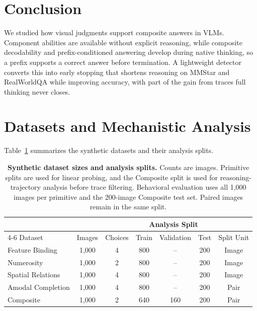 \documentclass{article} %
\begin{document}
\vspace{-4mm}
\section{Conclusion}\label{sec:conclusion}
\vspace{-1mm}

We studied how visual judgments support composite answers in VLMs. Component abilities are available without explicit reasoning, while composite decodability and prefix-conditioned answering develop during native thinking, so a prefix supports a correct answer before termination. A lightweight detector converts this into early stopping that shortens reasoning on MMStar and RealWorldQA while improving accuracy, with part of the gain from traces full thinking never closes.




\appendix
\section{Datasets and Mechanistic Analysis}
\label{app:data_generation}

Table~\ref{tab:dataset_splits} summarizes the synthetic datasets and their analysis splits.

\begin{table}[H]
    \centering
    \small
    \renewcommand{\arraystretch}{1.05}
    \setlength{\tabcolsep}{2pt}
    \caption{\textbf{Synthetic dataset sizes and analysis splits.} Counts are images. Primitive splits are used for linear probing, and the Composite split is used for reasoning-trajectory analysis before trace filtering. Behavioral evaluation uses all 1,000 images per primitive and the 200-image Composite test set. Paired images remain in the same split.}
    \label{tab:dataset_splits}
    \begin{tabular*}{\textwidth}{@{\extracolsep{\fill}}lcccccc@{}}
        \toprule
        & & & \multicolumn{3}{c}{\textbf{Analysis Split}} & \\
        \cmidrule(lr){4-6}
        Dataset & Images & Choices & Train & Validation & Test & Split Unit \\
        \midrule
        Feature Binding & 1,000 & 4 & 800 & -- & 200 & Image \\
        Numerosity & 1,000 & 2 & 800 & -- & 200 & Image \\
        Spatial Relations & 1,000 & 4 & 800 & -- & 200 & Image \\
        Amodal Completion & 1,000 & 4 & 800 & -- & 200 & Pair \\
        Composite & 1,000 & 2 & 640 & 160 & 200 & Pair \\
        \bottomrule
    \end{tabular*}
\end{table}
\end{document}
